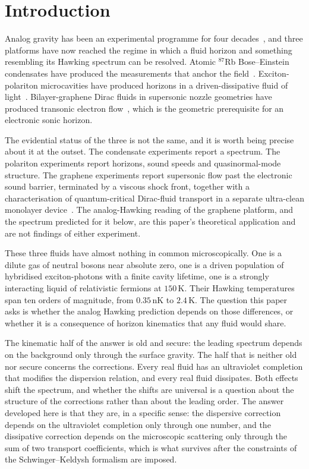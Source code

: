 \documentclass[aps,prd,reprint,nofootinbib,superscriptaddress]{revtex4-2}
\begin{document}
\maketitle

\section{Introduction}
\label{sec:intro}

Analog gravity has been an experimental programme for four
decades~\cite{Unruh1981,Visser1998}, and three platforms have now reached
the regime in which a fluid horizon and something resembling its Hawking
spectrum can be resolved. Atomic $^{87}$Rb Bose--Einstein condensates
have produced the measurements that anchor the
field~\cite{Steinhauer2016,deNova2019}. Exciton-polariton microcavities
have produced horizons in a driven-dissipative fluid of
light~\cite{Falque2025,Giacobino2025}. Bilayer-graphene Dirac fluids in
supersonic nozzle geometries have produced transonic electron
flow~\cite{Geurs2025}, which is the geometric prerequisite for an
electronic sonic horizon.

The evidential status of the three is not the same, and it is worth
being precise about it at the outset. The condensate experiments report
a spectrum. The polariton experiments report horizons, sound speeds and
quasinormal-mode structure. The graphene experiments report supersonic
flow past the electronic sound barrier, terminated by a viscous shock
front, together with a characterisation of quantum-critical Dirac-fluid
transport in a separate ultra-clean monolayer
device~\cite{Majumdar2025}. The analog-Hawking reading of the graphene
platform, and the spectrum predicted for it below, are this paper's
theoretical application and are not findings of either experiment.

These three fluids have almost nothing in common microscopically. One is
a dilute gas of neutral bosons near absolute zero, one is a driven
population of hybridised exciton-photons with a finite cavity lifetime,
one is a strongly interacting liquid of relativistic fermions at
$150\,\mathrm{K}$. Their Hawking temperatures span ten orders of
magnitude, from $0.35\,\mathrm{nK}$ to $2.4\,\mathrm{K}$. The question
this paper asks is whether the analog Hawking prediction depends on
those differences, or whether it is a consequence of horizon kinematics
that any fluid would share.

The kinematic half of the answer is old and secure: the leading spectrum
depends on the background only through the surface gravity. The half
that is neither old nor secure concerns the corrections. Every real
fluid has an ultraviolet completion that modifies the dispersion
relation, and every real fluid dissipates. Both effects shift the
spectrum, and whether the shifts are universal is a question about the
structure of the corrections rather than about the leading order. The
answer developed here is that they are, in a specific sense: the
dispersive correction depends on the ultraviolet completion only through
one number, and the dissipative correction depends on the microscopic
scattering only through the sum of two transport coefficients, which is
what survives after the constraints of the Schwinger--Keldysh formalism
are imposed.
\end{document}
